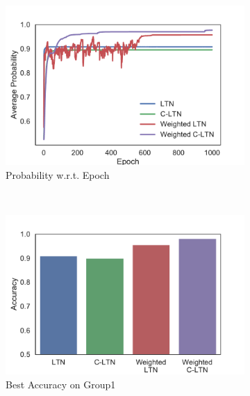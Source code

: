 \begin{figure}[!]
    \centering
    \begin{subfigure}[]{0.33\textwidth}
        \includegraphics[width=\textwidth]{img/curve2.pdf}
        \caption{Probability w.r.t. Epoch}
        \label{fig:learning-prob-epoch}
    \end{subfigure}~~~~
    \begin{subfigure}[]{0.33\textwidth}
        \includegraphics[width=\textwidth]{img/bar3.pdf}
        \caption{Best Accuracy on Group1}
        \label{fig:learning-best-accuracy-1}
    \end{subfigure}~~~~
    \begin{subfigure}[]{0.33\textwidth}

\end{subfigure}
\end{figure}
